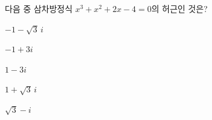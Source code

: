 다음 중 삼차방정식 $x^3+x^2+2x-4=0$의 허근인 것은?
\begin{choices32}{\rule[-3ex]{0pt}{8ex}$-1-\sqrt{3}\,i$}{\rule[-3ex]{0pt}{8ex}$-1+3i$}{\rule[-3ex]{0pt}{8ex}$1-3i$}{\rule[-3ex]{0pt}{8ex}$1+\sqrt{3}\,i$}{\rule[-3ex]{0pt}{8ex}$\sqrt{3}-i$}\end{choices32}
